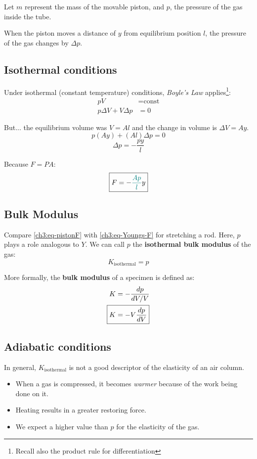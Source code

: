Let $m$ represent the mass of the movable piston, and $p$, the pressure of the gas inside the tube.

When the piston moves a distance of $y$ from equilibrium position $l$, the pressure of the gas changes by $\Delta p$.

\subsection{Isothermal conditions}
Under {isothermal} (constant temperature) conditions, \emph{Boyle's Law} applies\footnote{Recall also the product rule for differentiation}:
\begin{align*}
pV &= \text{const} \\
p\Delta V + V\Delta p &= 0
\end{align*}

But... the equilibrium volume was $V = Al$ and the change in volume is $\Delta V = Ay$.
\[ p(Ay) + (Al)\Delta p = 0 \]
\[ \Delta p = -\frac{py}{l} \]

Because $F=PA$:
\begin{equation}
	\boxed{F=-\textcolor{teal}{\frac{Ap}{l}} y } \label{ch3:eq-pistonF}
\end{equation}

\subsection{Bulk Modulus} \label{ch3:sec-bulk-modulus}

Compare \eqref{ch3:eq-pistonF} with \eqref{ch3:eq-Youngs-F} for stretching a rod. Here, $p$ plays a role analogous to $Y$. We can call $p$ the \textbf{isothermal bulk modulus} of the gas:
\begin{equation*}
	K_\text{isothermal} = p
\end{equation*}

More formally, the \textbf{bulk modulus} of a specimen is defined as:
\begin{align*}
	K &= -\frac{dp}{dV/V} \notag \\
	\Aboxed{K &= -V\frac{dp}{dV}}
\end{align*}

\subsection{Adiabatic conditions}

In general, $K_\text{isothermal}$ is not a good descriptor of the elasticity of an air column.
\begin{itemize}
	\item When a gas is compressed, it becomes \emph{warmer} because of the work being done on it.
	\item Heating results in a greater restoring force.
	\item We expect a higher value than $p$ for the elasticity of the gas.
\end{itemize}

